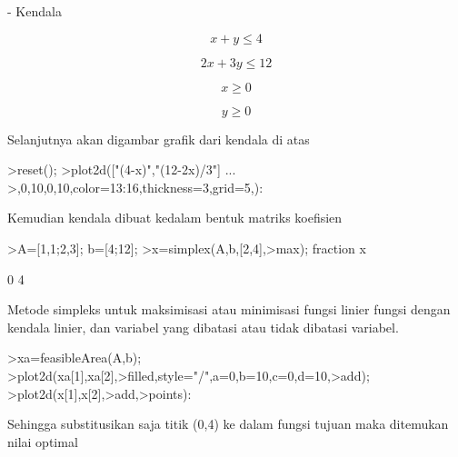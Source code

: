\documentclass{article}
\begin{document}
\begin{eulernotebook}
\begin{eulercomment}
\begin{eulercomment}
\begin{eulercomment}
\begin{eulercomment}
\begin{eulercomment}
- Kendala\\
\end{eulercomment}
\begin{eulerformula}
\[
x+y\le 4
\]
\end{eulerformula}
\begin{eulerformula}
\[
2x+3y\le 12
\]
\end{eulerformula}
\begin{eulerformula}
\[
x\ge 0
\]
\end{eulerformula}
\begin{eulerformula}
\[
y\ge 0
\]
\end{eulerformula}
\begin{eulercomment}
Selanjutnya akan digambar grafik dari kendala di atas
\end{eulercomment}
\begin{eulerprompt}
>reset();
>plot2d(["(4-x)","(12-2x)/3"] ...
>,0,10,0,10,color=13:16,thickness=3,grid=5,):
\end{eulerprompt}
\begin{eulercomment}
Kemudian kendala dibuat kedalam bentuk matriks koefisien
\end{eulercomment}
\begin{eulerprompt}
>A=[1,1;2,3]; b=[4;12];
>x=simplex(A,b,[2,4],>max); fraction x
\end{eulerprompt}
\begin{euleroutput}
          0 
          4 
\end{euleroutput}
\begin{eulercomment}
Metode simpleks untuk maksimisasi atau minimisasi fungsi linier fungsi
dengan kendala linier, dan variabel yang dibatasi atau tidak dibatasi
variabel. 
\end{eulercomment}
\begin{eulerprompt}
>xa=feasibleArea(A,b);
>plot2d(xa[1],xa[2],>filled,style="/",a=0,b=10,c=0,d=10,>add);
>plot2d(x[1],x[2],>add,>points):
\end{eulerprompt}
\begin{eulercomment}
Sehingga substitusikan saja titik (0,4) ke dalam fungsi tujuan maka
ditemukan nilai optimal


\end{eulercomment}
\end{eulercomment}
\end{eulercomment}
\end{eulercomment}
\end{eulercomment}
\end{eulernotebook}
\end{document}
